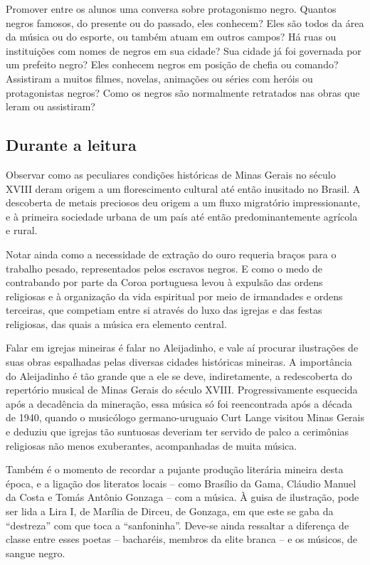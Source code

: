 \documentclass[11pt]{extarticle}
\begin{document}
Promover entre os alunos uma conversa sobre protagonismo negro. Quantos negros
famosos, do presente ou do passado, eles conhecem? Eles são todos da área da
música ou do esporte, ou também atuam em outros campos? Há ruas ou instituições
com nomes de negros em sua cidade?  Sua cidade já foi governada por um prefeito
negro? Eles conhecem negros em posição de chefia ou comando? Assistiram a
muitos filmes, novelas, animações ou séries com heróis ou protagonistas negros?
Como os negros são normalmente retratados nas obras que leram ou assistiram?

\subsection{Durante a leitura}

  Observar como as peculiares condições históricas de Minas Gerais no século
XVIII deram origem a um florescimento cultural até então inusitado no Brasil. A
descoberta de metais preciosos deu origem a um fluxo migratório impressionante,
e à primeira sociedade urbana de um país até então predominantemente agrícola e
rural.

Notar ainda como a necessidade de extração do ouro requeria braços para o
trabalho pesado, representados pelos escravos negros. E como o medo de
contrabando por parte da Coroa portuguesa levou à expulsão das ordens
religiosas e à organização da vida espiritual por meio de irmandades e ordens
terceiras, que competiam entre si através do luxo das igrejas e das festas
religiosas, das quais a música era elemento central.

Falar em igrejas mineiras é falar no Aleijadinho, e vale aí procurar
ilustrações de suas obras espalhadas pelas diversas cidades históricas
mineiras. A importância do Aleijadinho é tão grande que a ele se deve,
indiretamente, a redescoberta do repertório musical de Minas Gerais do século
XVIII. Progressivamente esquecida após a decadência da mineração, essa música
só foi reencontrada após a década de 1940, quando o musicólogo germano-uruguaio
Curt Lange visitou Minas Gerais e deduziu que igrejas tão suntuosas deveriam
ter servido de palco a cerimônias religiosas não menos exuberantes,
acompanhadas de muita música.

Também é o momento de recordar a pujante produção literária mineira desta
época, e a ligação dos literatos locais – como Brasílio da Gama, Cláudio Manuel
da Costa e Tomás Antônio Gonzaga – com a música. À guisa de ilustração, pode
ser lida a Lira I, de Marília de Dirceu, de Gonzaga, em que este se gaba da
“destreza” com que toca a “sanfoninha”. Deve-se ainda ressaltar a diferença de
classe entre esses poetas – bacharéis, membros da elite branca –  e os músicos,
de sangue negro.
\end{document}
